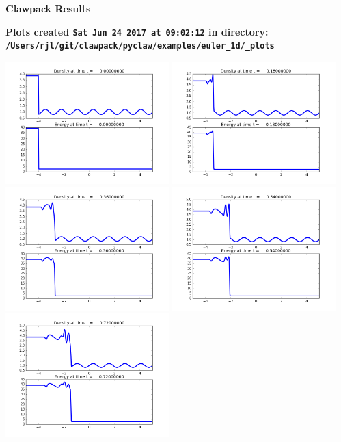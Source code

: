 \documentclass[11pt]{article}
\begin{document}
        \begin{center}{\Large\bf Clawpack Results}\vskip 5pt
        
        \bf Plots created {\tt Sat Jun 24 2017 at 09:02:12} in directory: \vskip 5pt
        \verb+/Users/rjl/git/clawpack/pyclaw/examples/euler_1d/_plots+
        \end{center}
        \vskip 5pt
        \includegraphics[width=0.475\textwidth]{frame0000fig0.png}
\includegraphics[width=0.475\textwidth]{frame0001fig0.png}
\vskip 10pt 
\includegraphics[width=0.475\textwidth]{frame0002fig0.png}
\includegraphics[width=0.475\textwidth]{frame0003fig0.png}
\vskip 10pt 
\includegraphics[width=0.475\textwidth]{frame0004fig0.png}
\end{document}
